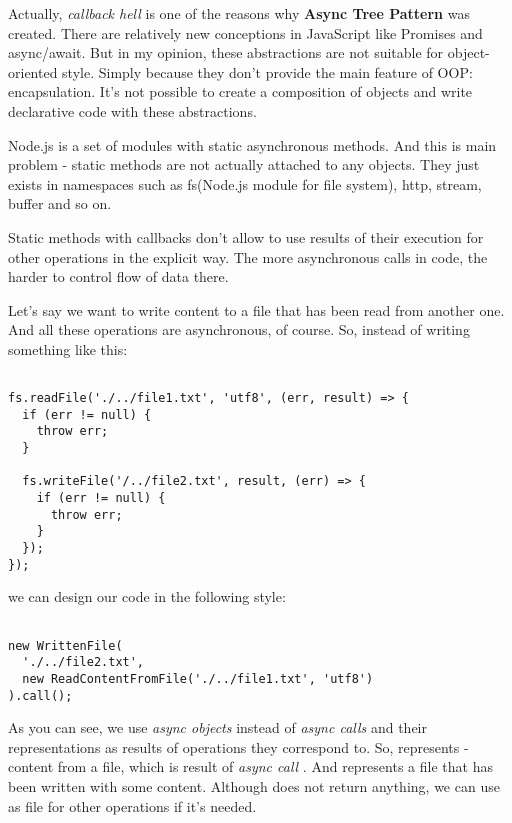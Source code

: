 \documentclass{article}
\newcommand{\cit}[1]{{\fontfamily{qcr}\selectfont{\textit{\textbf{\textcolor{darkgray}{#1}}}}}}
\begin{document}
Actually, \textit{callback hell} is one of the reasons why \textbf{Async Tree Pattern} was created. There are relatively new conceptions in JavaScript like Promises and async/await. But in my opinion, these abstractions are not suitable for object-oriented style. Simply because they don't provide the main feature of OOP: encapsulation. 
It's not possible to create a composition of objects and write declarative code with these abstractions.

Node.js is a set of modules with static asynchronous methods. And this is main problem - static methods are not actually attached to any objects. They just exists in namespaces such as fs(Node.js module for file system), http, stream, buffer and so on.

Static methods with callbacks don't allow to use results of their execution for other operations in the explicit way. The more asynchronous calls in code, the harder to control flow of data there.

Let's say we want to write content to a file that has been read from another one. And all these operations are asynchronous, of course. So, instead of writing something like this:

\begin{lstlisting}

fs.readFile('./../file1.txt', 'utf8', (err, result) => {
  if (err != null) {
    throw err;
  }
 
  fs.writeFile('/../file2.txt', result, (err) => {
    if (err != null) {
      throw err;
    }
  });
});

\end{lstlisting}

we can design our code in the following style:

\begin{lstlisting}

new WrittenFile(
  './../file2.txt',
  new ReadContentFromFile('./../file1.txt', 'utf8')
).call();

\end{lstlisting}

As you can see, we use \textit{async objects} instead of \textit{async calls} and their representations as results of operations they correspond to. So, \cit{ReadContentFromFile} represents \cit{string} - content from a file, which is result of \textit{async call} \cit{fs.readFile}. And \cit{WrittenFile} represents a file that has been written with some content. Although \cit{fs.WriteFile} does not return anything, we can use \cit{WrittenFile} as file for other operations if it's needed.
\end{document}
